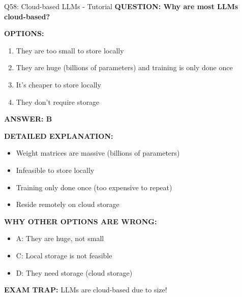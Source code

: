 \documentclass[8pt]{beamer}
\begin{document}
	\begin{frame}{Q58: Cloud-based LLMs - Tutorial}
		\fontsize{6.5}{7.5}\selectfont
		\textbf{QUESTION: Why are most LLMs cloud-based?}
		
		\vspace{0.1cm}
		\textbf{OPTIONS:}
		\begin{enumerate}
			\item They are too small to store locally
			\item They are huge (billions of parameters) and training is only done once
			\item It's cheaper to store locally
			\item They don't require storage
		\end{enumerate}
		
		\vspace{0.1cm}
		\textcolor{myblue}{\textbf{ANSWER: B}}
		
		\vspace{0.1cm}
		\textbf{DETAILED EXPLANATION:}
		\begin{itemize}
			\item Weight matrices are massive (billions of parameters)
			\item Infeasible to store locally
			\item Training only done once (too expensive to repeat)
			\item Reside remotely on cloud storage
		\end{itemize}
		
		\vspace{0.1cm}
		\textcolor{myred}{\textbf{WHY OTHER OPTIONS ARE WRONG:}}
		\begin{itemize}
			\item \textcolor{myred}{A:} They are huge, not small
			\item \textcolor{myred}{C:} Local storage is not feasible
			\item \textcolor{myred}{D:} They need storage (cloud storage)
		\end{itemize}
		
		\textcolor{myred}{\textbf{EXAM TRAP:}} LLMs are \textcolor{myblue}{cloud-based due to size}!
	\end{frame}
	
\end{document}
